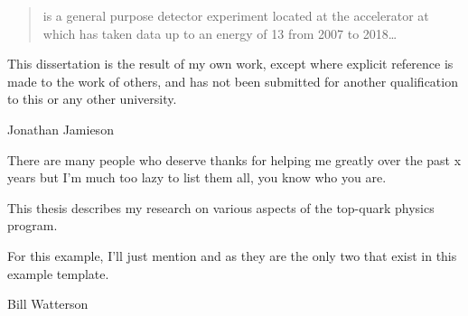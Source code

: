 
\begin{abstract}%
  \ATLAS is a general purpose detector experiment located at the \LHC accelerator at \CERN which has taken data up to an energy of \unit{13}{\TeV} from 2007 to 2018\dots
\end{abstract}


\begin{declaration}
  This dissertation is the result of my own work, except where explicit
  reference is made to the work of others, and has not been submitted
  for another qualification to this or any other university.
  \vspace*{1cm}
  \begin{flushright}
    Jonathan Jamieson
  \end{flushright}
\end{declaration}


\begin{acknowledgements}
  There are many people who deserve thanks for helping me greatly over the past x years but I'm much too lazy to list them all, you know who you are.
\end{acknowledgements}


\begin{preface}
  This thesis describes my research on various aspects of the \ATLAS
  top-quark physics program.

  \noindent
  For this example, I'll just mention 
  and  as they are the only two that exist in this example template.
\end{preface}

\tableofcontents


%
  {Bill Watterson}
\thispagestyle{empty}
